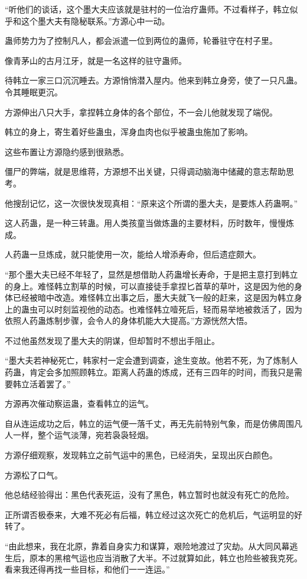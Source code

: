 \begin{this_body}
“听他们的谈话，这个墨大夫应该就是驻村的一位治疗蛊师。不过看样子，韩立似乎和这个墨大夫有隐秘联系。”方源心中一动。

蛊师势力为了控制凡人，都会派遣一位到两位的蛊师，轮番驻守在村子里。

像青茅山的古月江牙，就是一名这样的驻守蛊师。

待韩立一家三口沉沉睡去。方源悄悄潜入屋内。他来到韩立身旁，使了一只凡蛊。令其睡眠更沉。

方源伸出八只大手，拿捏韩立身体的各个部位，不一会儿他就发现了端倪。

韩立的身上，寄生着好些蛊虫，浑身血肉也似乎被蛊虫施加了影响。

这些布置让方源隐约感到很熟悉。

僵尸的弊端，就是思维蒋，方源想不出关键，只得调动脑海中储藏的意志帮助思考。

他搜刮记忆，这一次很快发现真相：“原来这个所谓的墨大夫，是要炼人药蛊啊。”

这人药蛊，是一种三转蛊。用人类孩童当做炼蛊的主要材料，历时数年，慢慢炼成。

人药蛊一旦炼成，就只能使用一次，能给人增添寿命，但后遗症颇大。

“那个墨大夫已经不年轻了，显然是想借助人药蛊增长寿命，于是把主意打到韩立的身上。难怪韩立割草的时候，可以直接徒手拿捏匕首草的草叶，这是因为他的身体已经被暗中改造。难怪韩立出事之后，墨大夫就飞一般的赶来，这是因为韩立身上的蛊虫可以时刻监视他的动态。也难怪韩立噎死后，轻而易举地被救活了，因为依照人药蛊炼制步骤，会令人的身体机能大大提高。”方源恍然大悟。

不过他虽然发现了墨大夫的阴谋，但却暂时不想出手阻止。

“墨大夫若神秘死亡，韩家村一定会遭到调查，途生变故。他若不死，为了炼制人药蛊，肯定会多加照顾韩立。距离人药蛊的炼成，还有三四年的时间，而我只是需要韩立活着罢了。”

方源再次催动察运蛊，查看韩立的运气。

自从连运成功之后，韩立的运气便一落千丈，再无先前特别气象，而是仿佛周围凡人一样，整个运气淡薄，宛若袅袅轻烟。

方源仔细观察，发现韩立之前气运中的黑色，已经消失，呈现出灰白颜色。

方源松了口气。

他总结经验得出：黑色代表死运，没有了黑色，韩立暂时也就没有死亡的危险。

正所谓否极泰来，大难不死必有后福，韩立经过这次死亡的危机后，气运明显的好转了。

“由此想来，我在北原，靠着自身实力和谋算，艰险地渡过了灾劫。从大同风幕逃生后，原本的黑棺气运也应当消散了大半。不过就算如此，韩立也险些被我克死。看来我还得再找一些目标，和他们一一连运。”


\end{this_body}
